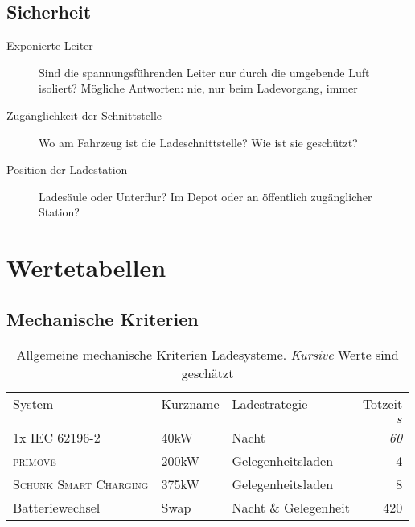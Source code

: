 \subsection{Sicherheit}
\begin{description}
	\item [Exponierte Leiter]
	Sind die spannungsführenden Leiter nur durch die umgebende Luft isoliert? Mögliche Antworten: nie, nur beim Ladevorgang, immer
	\item [Zugänglichkeit der Schnittstelle]
	Wo am Fahrzeug ist die Ladeschnittstelle? Wie ist sie geschützt?
	\item [Position der Ladestation]
	Ladesäule oder Unterflur? Im Depot oder an öffentlich zugänglicher Station?	
\end{description}


\section{Wertetabellen}
\label{sec_tabellen_ladesysteme}
\FloatBarrier
\subsection{Mechanische Kriterien}
\begin{table}[h!]\centering
	\begin{tabularx}{\textwidth}{lXlr}
		\toprule
		System                         & Kurzname & Ladestrategie        & Totzeit \\
		                               &          &                      & $s$     \\ \midrule
		1x \textsc{IEC 62196-2}        & 40kW     & Nacht  & \emph{60} \\
		\textsc{primove}               & 200kW    & Gelegenheitsladen    & 4 \\
		\textsc{Schunk Smart Charging} & 375kW    & Gelegenheitsladen    & 8 \\
		Batteriewechsel                & Swap     & Nacht \& Gelegenheit & 420 \\ \bottomrule
	\end{tabularx}
	\caption[Allgemeine mechanische Kriterien Ladesysteme]{Allgemeine mechanische Kriterien Ladesysteme. \emph{Kursive} Werte sind geschätzt}
	\label{tab_mech_Ladesys_allg}
\end{table}

